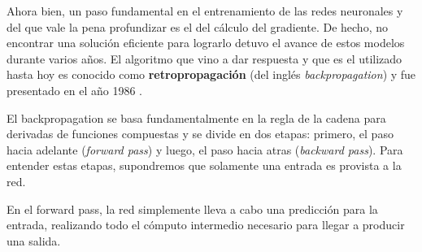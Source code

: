 \documentclass[../../main.tex]{subfiles}
\begin{document}
Ahora bien, un paso fundamental en el entrenamiento de las redes neuronales y del que vale
la pena profundizar es el del cálculo del gradiente. De hecho, no encontrar una solución
eficiente para lograrlo detuvo el avance de estos modelos durante varios años. El algoritmo
que vino a dar respuesta y que es el utilizado hasta hoy es conocido como
\textbf{retropropagación} (del inglés \textit{backpropagation}) y fue presentado en el año
1986 \cite{backprop-1986}.

El backpropagation se basa fundamentalmente en la regla de la cadena para derivadas de
funciones compuestas y se divide en dos etapas: primero, el paso hacia adelante
(\textit{forward pass}) y luego, el paso hacia atras (\textit{backward pass}). Para
entender estas etapas, supondremos que solamente una entrada es provista a la red.

En el forward pass, la red simplemente lleva a cabo una predicción para la entrada,
realizando todo el cómputo intermedio necesario para llegar a producir una salida.
\end{document}
